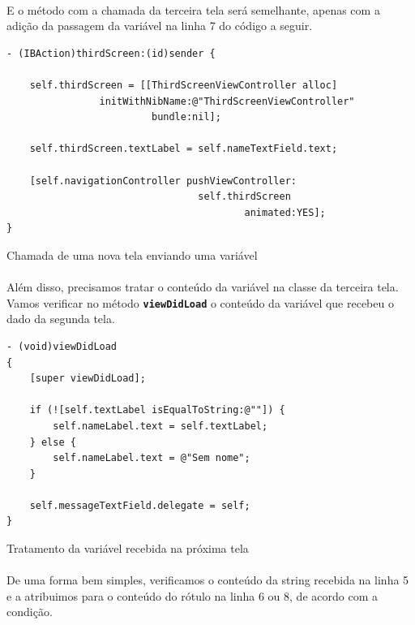 \documentclass[a4paper,12pt,brazil,doubleside]{book}
\begin{document}
\begin{singlespace}
\bigskip

\paragraph{}E o método com a chamada da terceira tela será semelhante, apenas com a adição da passagem da variável na linha 7 do código a seguir.

\begin{listing}[H]
\begin{verbatim}
- (IBAction)thirdScreen:(id)sender {

    self.thirdScreen = [[ThirdScreenViewController alloc]
                initWithNibName:@"ThirdScreenViewController"
                         bundle:nil];
    
    self.thirdScreen.textLabel = self.nameTextField.text;
    
    [self.navigationController pushViewController:
                                 self.thirdScreen
                                         animated:YES];
}
\end{verbatim}
\caption{Chamada de uma nova tela enviando uma variável}
\end{listing}

\paragraph{}Além disso, precisamos tratar o conteúdo da variável na classe da terceira tela. Vamos verificar no método \texttt{\textbf{viewDidLoad}} o conteúdo da variável que recebeu o dado da segunda tela.

\begin{listing}[H]
\begin{verbatim}
- (void)viewDidLoad
{
    [super viewDidLoad];
    
    if (![self.textLabel isEqualToString:@""]) {
        self.nameLabel.text = self.textLabel;
    } else {
        self.nameLabel.text = @"Sem nome";
    }
    
    self.messageTextField.delegate = self;
}
\end{verbatim}
\caption{Tratamento da variável recebida na próxima tela}
\end{listing}

\paragraph{}De uma forma bem simples, verificamos o conteúdo da string recebida na linha 5 e a atribuimos para o conteúdo do rótulo na linha 6 ou 8, de acordo com a condição.

\end{singlespace}
\end{document}
